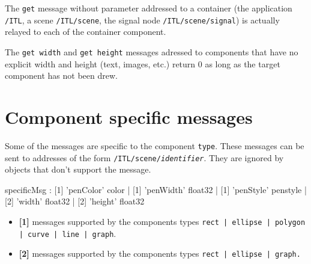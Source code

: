 \documentclass[a4paper,twoside]{report}
\newcommand{\toplevel}[1]	{\chapter{#1}}
\newcommand{\OSC}[1]		{\texttt{#1}}
\begin{document}
The \OSC{get} message without parameter addressed to a container (the application \OSC{/ITL}, a scene \OSC{/ITL/scene}, the signal node \OSC{/ITL/scene/signal}) is actually relayed to each of the container component.  

The \OSC{get width} and \OSC{get height} messages adressed to components that have no explicit width and height (text, images, etc.) return 0 as long as the target component has not been drew.



\toplevel{Component specific messages}
\label{specificMsg}
Some of the messages are specific to the component \OSC{type}. These messages can be sent to addresses of the form \OSC{/ITL/scene/\textit{identifier}}. They are ignored by objects that don't support the message. 


\begin{rail}
specificMsg : 	  [1] 'penColor' color 
				| [1] 'penWidth' float32
				| [1] 'penStyle' penstyle
				| [2] 'width' float32
				| [2] 'height' float32
\end{rail}

\begin{itemize}
\item \textbf{[1]} messages supported by the components types \OSC{rect | ellipse | polygon | curve | line | graph}.
\item \textbf{[2]} messages supported by the components types \OSC{rect | ellipse | graph.} %
\end{itemize}
\end{document}
